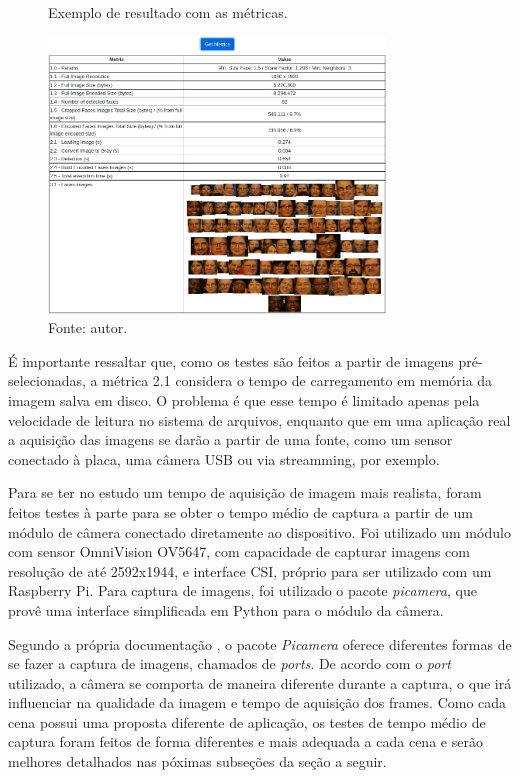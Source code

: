 \begin{figure}[h]
    \centering
    \caption[Exemplo de resultado com as métricas.]{Exemplo de resultado com as métricas.}
    \includegraphics[width=0.8\textwidth]{Cap3_Desenvolvimento/Figures/exemplo_metricas.jpg}
    \caption*{Fonte: autor.}
    \label{fig:resultadoMetricas}
\end{figure}

É importante ressaltar que, como os testes são feitos a partir de imagens pré-selecionadas, a métrica 2.1 considera o tempo de carregamento em memória da imagem salva em disco. O problema é que esse tempo é limitado apenas pela velocidade de leitura no sistema de arquivos, enquanto que em uma aplicação real a aquisição das imagens se darão a partir de uma fonte, como um sensor conectado à placa, uma câmera USB ou via streamming, por exemplo.

Para se ter no estudo um tempo de aquisição de imagem mais realista, foram feitos testes à parte para se obter o tempo médio de captura a partir de um módulo de câmera conectado diretamente ao dispositivo. Foi utilizado um módulo com sensor OmniVision OV5647, com capacidade de capturar imagens com resolução de até 2592x1944, e interface CSI, próprio para ser utilizado com um Raspberry Pi. Para captura de imagens, foi utilizado o pacote \emph{picamera}, que provê uma interface simplificada em Python para o módulo da câmera.

Segundo a própria documentação \cite{Picamera}, o pacote \emph{Picamera} oferece diferentes formas de se fazer a captura de imagens, chamados de \emph{ports}. De acordo com o \emph{port} utilizado, a câmera se comporta de maneira diferente durante a captura, o que irá influenciar na qualidade da imagem e tempo de aquisição dos frames. Como cada cena possui uma proposta diferente de aplicação, os testes de tempo médio de captura foram feitos de forma diferentes e mais adequada a cada cena e serão melhores detalhados nas póximas subseções da seção a seguir.

